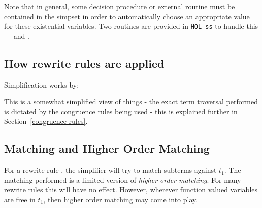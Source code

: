 Note that in general, some decision procedure or external routine must
be contained in the simpset in order to automatically choose an
appropriate value for these existential variables.  Two routines are
provided in {\tt HOL\_ss} to handle this ---  and
.

\subsection{How rewrite rules are applied}

Simplification works by:

This is a somewhat simplified view of things - the exact term traversal
performed is dictated by the congruence rules being used - this is
explained further in Section~\ref{congruence-rules}.


\subsection{Matching and Higher Order Matching}

For a rewrite rule ,
the simplifier will try to match subterms against $t_1$.  The
matching performed is a limited version of {\it higher order
matching}.  For many rewrite rules this will have no effect.  However,
wherever function valued variables are free in $t_1$, then higher
order matching may come into play.

